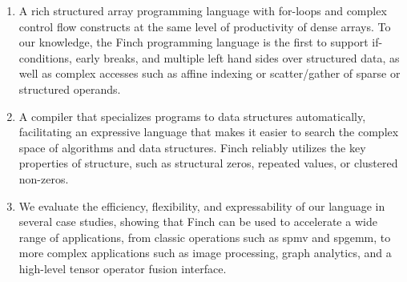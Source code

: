 \begin{enumerate}
\item A rich structured array programming language with for-loops
and complex control flow constructs at the same level of productivity
of dense arrays. 
%
To our knowledge, the Finch programming language is the first 
to support if-conditions, early breaks, and multiple left hand sides over
structured data, as well as complex accesses such as affine indexing or scatter/gather of sparse or structured operands. 
%
\item A compiler that specializes programs to data structures automatically,
facilitating an expressive language that makes it easier to search the complex
space of algorithms and data structures. Finch reliably utilizes the key properties of structure, such as structural zeros, repeated values, or clustered non-zeros.
%
\item We evaluate the efficiency, flexibility, and expressability of our language in several case studies, showing that Finch can be used to accelerate a wide range of applications,  from classic operations such as spmv and spgemm, to more complex applications such as image processing, graph analytics, and a high-level tensor operator fusion interface. 
\end{enumerate}
